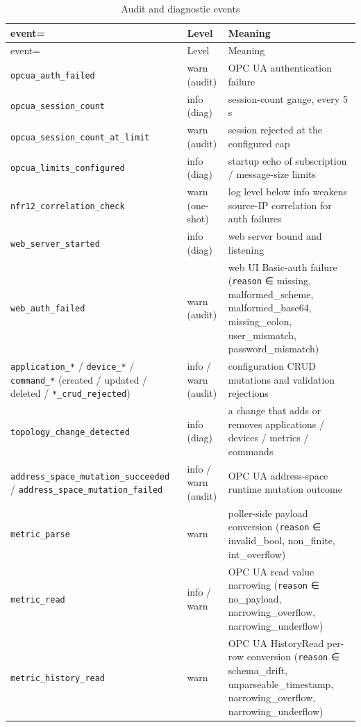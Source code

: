 \begin{longtable}[]{@{}lll@{}}
\caption{Audit and diagnostic events}\tabularnewline
\toprule\noalign{}
event= & Level & Meaning \\
\midrule\noalign{}
\endfirsthead
\toprule\noalign{}
event= & Level & Meaning \\
\midrule\noalign{}
\endhead
\bottomrule\noalign{}
\endlastfoot
\texttt{opcua\_auth\_failed} & warn (audit) & OPC UA authentication failure \\
\texttt{opcua\_session\_count} & info (diag) & session-count gauge, every 5 s \\
\texttt{opcua\_session\_count\_at\_limit} & warn (audit) & session rejected at the configured cap \\
\texttt{opcua\_limits\_configured} & info (diag) & startup echo of subscription / message-size limits \\
\texttt{nfr12\_correlation\_check} & warn (one-shot) & log level below info weakens source-IP correlation for auth failures \\
\texttt{web\_server\_started} & info (diag) & web server bound and listening \\
\texttt{web\_auth\_failed} & warn (audit) & web UI Basic-auth failure (\texttt{reason} ∈ missing, malformed\_scheme, malformed\_base64, missing\_colon, user\_mismatch, password\_mismatch) \\
\texttt{application\_*} / \texttt{device\_*} / \texttt{command\_*} (created / updated / deleted / \texttt{*\_crud\_rejected}) & info / warn (audit) & configuration CRUD mutations and validation rejections \\
\texttt{topology\_change\_detected} & info (diag) & a change that adds or removes applications / devices / metrics / commands \\
\texttt{address\_space\_mutation\_succeeded} / \texttt{address\_space\_mutation\_failed} & info / warn (audit) & OPC UA address-space runtime mutation outcome \\
\texttt{metric\_parse} & warn & poller-side payload conversion (\texttt{reason} ∈ invalid\_bool, non\_finite, int\_overflow) \\
\texttt{metric\_read} & info / warn & OPC UA read value narrowing (\texttt{reason} ∈ no\_payload, narrowing\_overflow, narrowing\_underflow) \\
\texttt{metric\_history\_read} & warn & OPC UA HistoryRead per-row conversion (\texttt{reason} ∈ schema\_drift, unparseable\_timestamp, narrowing\_overflow, narrowing\_underflow) \\

\end{longtable}
